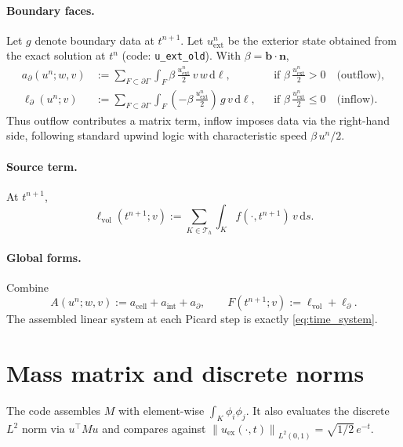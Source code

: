 \documentclass[11pt]{article}
\newcommand{\Th}{\mathcal{T}_h}
\newcommand{\Kh}{K}
\newcommand{\norm}[1]{\left\lVert #1\right\rVert}
\begin{document}
\paragraph{Boundary faces.}
Let $g$ denote boundary data at $t^{n+1}$. Let $u_{\text{ext}}^n$ be the exterior state obtained from the exact solution at $t^n$ (code: \texttt{u\_ext\_old}). With $\beta=\bm b\cdot\bm n$,
\begin{align}
a_{\partial}(u^n; w,v) &:= \sum_{F\subset\partial\Gamma}
\int_F \beta\,\frac{u_{\text{ext}}^n}{2}\, v\, w \,\mathrm d\ell,
&& \text{if }\beta\,\frac{u_{\text{ext}}^n}{2}>0 \quad \text{(outflow)}, \label{eq:bdry-matrix}
\\
\ell_{\partial}(u^n; v) &:= \sum_{F\subset\partial\Gamma}
\int_F \left(-\beta\,\frac{u_{\text{ext}}^n}{2}\right)\, g\, v \,\mathrm d\ell,
&& \text{if }\beta\,\frac{u_{\text{ext}}^n}{2}\le 0 \quad \text{(inflow)}. \label{eq:bdry-rhs}
\end{align}
Thus outflow contributes a matrix term, inflow imposes data via the right-hand side, following standard upwind logic with characteristic speed $\beta\,u^n/2$.

\paragraph{Source term.}
At $t^{n+1}$,
\begin{equation}
\ell_{\text{vol}}(t^{n+1}; v) := \sum_{\Kh\in\Th}\int_\Kh f(\cdot,t^{n+1})\, v \,\mathrm ds .
\end{equation}

\paragraph{Global forms.}
Combine
\begin{equation}
A(u^n; w,v) := a_{\text{cell}} + a_{\text{int}} + a_{\partial},\qquad
F(t^{n+1}; v) := \ell_{\text{vol}} + \ell_{\partial}.
\end{equation}
The assembled linear system at each Picard step is exactly \eqref{eq:time_system}.

\section{Mass matrix and discrete norms}
The code assembles $M$ with element-wise $\int_\Kh \phi_i\phi_j$.
It also evaluates the discrete $L^2$ norm via $u^\top M u$ and compares against
$\norm{u_{\text{ex}}(\cdot,t)}_{L^2(0,1)} = \sqrt{1/2}\,e^{-t}$.
\end{document}
